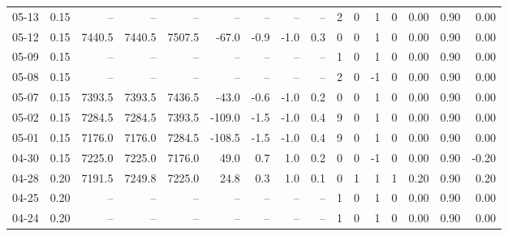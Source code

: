 \begin{threeparttable}
{\begin{tabular}{lrrrrrrrrrrrrrrr}
  05-13 &     0.15 &     -- &     -- &     -- &         -- &             -- &                       -- &                  -- &              2 &         0 &     1 &         0 &       0.00 &      0.90 &           0.00 \\
  05-12 &     0.15 & 7440.5 & 7440.5 & 7507.5 &      -67.0 &           -0.9 &                     -1.0 &                 0.3 &              0 &         0 &     1 &         0 &       0.00 &      0.90 &           0.00 \\
  05-09 &     0.15 &     -- &     -- &     -- &         -- &             -- &                       -- &                  -- &              1 &         0 &     1 &         0 &       0.00 &      0.90 &           0.00 \\
  05-08 &     0.15 &     -- &     -- &     -- &         -- &             -- &                       -- &                  -- &              2 &         0 &    -1 &         0 &       0.00 &      0.90 &           0.00 \\
  05-07 &     0.15 & 7393.5 & 7393.5 & 7436.5 &      -43.0 &           -0.6 &                     -1.0 &                 0.2 &              0 &         0 &     1 &         0 &       0.00 &      0.90 &           0.00 \\
  05-02 &     0.15 & 7284.5 & 7284.5 & 7393.5 &     -109.0 &           -1.5 &                     -1.0 &                 0.4 &              9 &         0 &     1 &         0 &       0.00 &      0.90 &           0.00 \\
  05-01 &     0.15 & 7176.0 & 7176.0 & 7284.5 &     -108.5 &           -1.5 &                     -1.0 &                 0.4 &              9 &         0 &     1 &         0 &       0.00 &      0.90 &           0.00 \\
  04-30 &     0.15 & 7225.0 & 7225.0 & 7176.0 &       49.0 &            0.7 &                      1.0 &                 0.2 &              0 &         0 &    -1 &         0 &       0.00 &      0.90 &          -0.20 \\
  04-28 &     0.20 & 7191.5 & 7249.8 & 7225.0 &       24.8 &            0.3 &                      1.0 &                 0.1 &              0 &         1 &     1 &         1 &       0.20 &      0.90 &           0.20 \\
  04-25 &     0.20 &     -- &     -- &     -- &         -- &             -- &                       -- &                  -- &              1 &         0 &     1 &         0 &       0.00 &      0.90 &           0.00 \\
  04-24 &     0.20 &     -- &     -- &     -- &         -- &             -- &                       -- &                  -- &              1 &         0 &     1 &         0 &       0.00 &      0.90 &           0.00 \\

\end{tabular}}
\end{threeparttable}
